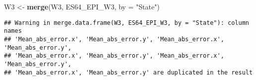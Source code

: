 \documentclass[
]{article}
\newenvironment{Shaded}{\begin{snugshade}}{\end{snugshade}}
\newcommand{\AttributeTok}[1]{\textcolor[rgb]{0.13,0.29,0.53}{#1}}
\newcommand{\FunctionTok}[1]{\textcolor[rgb]{0.13,0.29,0.53}{\textbf{#1}}}
\newcommand{\NormalTok}[1]{#1}
\newcommand{\OtherTok}[1]{\textcolor[rgb]{0.56,0.35,0.01}{#1}}
\newcommand{\StringTok}[1]{\textcolor[rgb]{0.31,0.60,0.02}{#1}}
\begin{document}
\begin{Shaded}
\begin{Highlighting}[]
\NormalTok{W3 }\OtherTok{\textless{}{-}} \FunctionTok{merge}\NormalTok{(W3, ES64\_EPI\_W3, }\AttributeTok{by =} \StringTok{"State"}\NormalTok{)}
\end{Highlighting}
\end{Shaded}

\begin{verbatim}
## Warning in merge.data.frame(W3, ES64_EPI_W3, by = "State"): column names
## 'Mean_abs_error.x', 'Mean_abs_error.y', 'Mean_abs_error.x', 'Mean_abs_error.y',
## 'Mean_abs_error.x', 'Mean_abs_error.y', 'Mean_abs_error.x', 'Mean_abs_error.y',
## 'Mean_abs_error.x', 'Mean_abs_error.y' are duplicated in the result
\end{verbatim}
\end{document}
